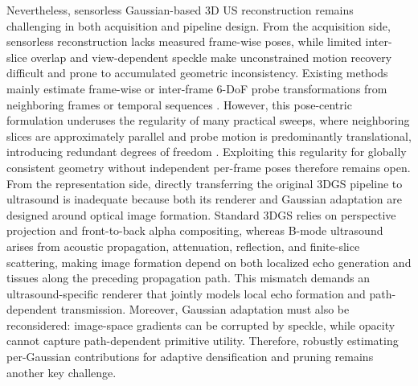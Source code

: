 Nevertheless, sensorless Gaussian-based 3D US reconstruction remains
challenging in both acquisition and pipeline design.
From the acquisition side, sensorless reconstruction lacks measured frame-wise
poses, while limited inter-slice overlap and view-dependent speckle make
unconstrained motion recovery difficult and prone to accumulated geometric
inconsistency.
Existing methods mainly estimate frame-wise or inter-frame 6-DoF probe
transformations from neighboring frames or temporal sequences
\cite{prevostDeepLearningSensorless2017,guoSensorlessFreehand3D2020,
guoUltrasoundVolumeReconstruction2023,luoRecONOnlineLearning2023,li2024f}.
However, this pose-centric formulation underuses the regularity of many
practical sweeps, where neighboring slices are approximately parallel and probe
motion is predominantly translational, introducing redundant degrees of freedom
\cite{huangMMSEReconstruction2008,liTUSREC2024}.
Exploiting this regularity for globally consistent geometry without independent
per-frame poses therefore remains open.
From the representation side, directly transferring the original 3DGS pipeline
to ultrasound is inadequate because both its renderer and Gaussian adaptation
are designed around optical image formation.
Standard 3DGS relies on perspective projection and front-to-back alpha
compositing, whereas B-mode ultrasound arises from acoustic propagation,
attenuation, reflection, and finite-slice scattering, making image formation
depend on both localized echo generation and tissues along the preceding
propagation path.
This mismatch demands an ultrasound-specific renderer that jointly models local
echo formation and path-dependent transmission.
Moreover, Gaussian adaptation must also be reconsidered: image-space gradients
can be corrupted by speckle, while opacity cannot capture path-dependent
primitive utility.
Therefore, robustly estimating per-Gaussian contributions for adaptive
densification and pruning remains another key challenge.

